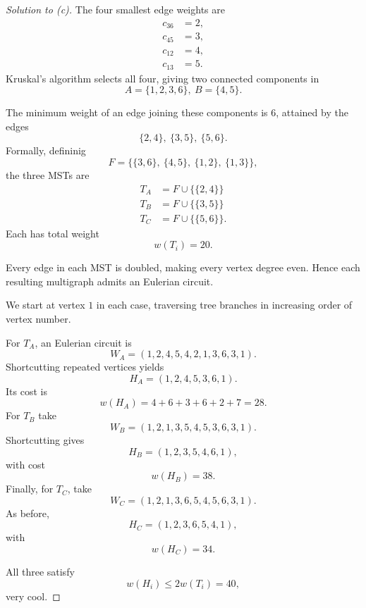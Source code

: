 \documentclass[11pt]{article}
\begin{document}
\begin{proof}[Solution to (c)]
    The four smallest edge weights are 
    \begin{align*}
        c_{36} &= 2, \\
        c_{45} &= 3, \\
        c_{12} &= 4, \\
        c_{13} &= 5. 
    \end{align*}
    Kruskal's algorithm selects all four, giving 
    two connected components in 
    \[
        A = \{1,2,3,6\}, \ B = \{4,5\}.
    \]

    The minimum weight of an edge joining 
    these components is $6$, attained by the 
    edges 
    \[
        \{2,4\}, \ \{3,5\}, \ \{5,6\}. 
    \]
    Formally, defininig 
    \[
        F = \{\{3,6\}, \ 
              \{4,5\}, \ 
              \{1,2\}, \ 
              \{1,3\}\},  
    \]
    the three MSTs are 
    \begin{align*}
        T_A &= F \cup \{\{2,4\}\} \\ 
        T_B &= F \cup \{\{3,5\}\} \\ 
        T_C &= F \cup \{\{5,6\}\}. 
    \end{align*}
    Each has total weight 
    \[
        w(T_i) = 20. 
    \]

    Every edge in each MST is doubled, making every 
    vertex degree even. Hence each resulting multigraph 
    admits an Eulerian circuit. 

    We start at vertex $1$ in each case, traversing 
    tree branches in increasing order of vertex number. 

    For $T_A$, an Eulerian circuit is 
    \[
        W_A = (1,2,4,5,4,2,1,3,6,3,1). 
    \]
    Shortcutting repeated vertices yields 
    \[
        H_A = (1,2,4,5,3,6,1). 
    \]
    Its cost is 
    \[
        w(H_A) = 4+6+3+6+2+7 = 28. 
    \]
    For $T_B$ take 
    \[
        W_B = (1,2,1,3,5,4,5,3,6,3,1). 
    \]
    Shortcutting gives 
    \[
        H_B=(1,2,3,5,4,6,1),
    \]
    with cost 
    \[
        w(H_B) = 38. 
    \]
    Finally, for $T_C$, take 
    \[
        W_C=(1,2,1,3,6,5,4,5,6,3,1).
    \]
    As before, 
    \[
        H_C=(1,2,3,6,5,4,1),
    \]
    with 
    \[
        w(H_C) = 34. 
    \]

    All three satisfy 
    \[
        w(H_i) \leq 2w(T_i) = 40, 
    \]
    very cool. 
\end{proof}
\end{document}
